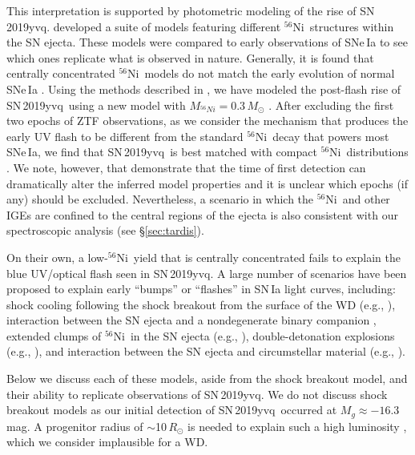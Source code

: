 \documentclass[twocolumn]{aastex63}
\newcommand{\radni}{$^{56}$Ni}
\newcommand{\sn}{SN\,2019yvq}
\begin{document}
This interpretation is supported by photometric modeling of the rise of \sn.
\citet{Magee20} developed a suite of models featuring different \radni\
structures within the SN ejecta. These models were compared to early
observations of SNe\,Ia to see which ones replicate what is observed in
nature. Generally, it is found that centrally concentrated \radni\ models do
not match the early evolution of normal SNe\,Ia \citep{Magee20}. Using the
methods described in \citet{Magee20}, we have modeled the post-flash rise of
\sn\ using a new model with $M_{^{56}Ni} = 0.3\,M_\odot$ \citep[the models
in][all have $M_{^{56}Ni} > 0.4\,M_\odot$ and are therefore more luminous than
\sn]{Magee20}. After excluding the first two epochs of ZTF observations, as we
consider the mechanism that produces the early UV flash to be different from
the standard \radni\ decay that powers most SNe\,Ia, we find that \sn\ is best
matched with compact \radni\ distributions \citep[following the convention
of][an \texttt{EXP\_Ni0.3\_KE1.40\_P21} model provides the best match to \sn,
see also Figure~\ref{fig:Ni_bullet}]{Magee20}. We note, however, that
\citet{Magee20} demonstrate that the time of first detection can dramatically
alter the inferred model properties and it is unclear which epochs (if any)
should be excluded. Nevertheless, a scenario in which the \radni\ and other
IGEs are confined to the central regions of the ejecta is also consistent with
our spectroscopic analysis (see \S\ref{sec:tardis}).

On their own, a low-\radni\ yield that is centrally concentrated fails to
explain the blue UV/optical flash seen in \sn. A large number of scenarios
have been proposed to explain early ``bumps'' or ``flashes'' in SN\,Ia light
curves, including: shock cooling following the shock breakout from the surface
of the WD (e.g., \citealt{Piro10,Rabinak11}), interaction between the SN
ejecta and a nondegenerate binary companion \citep{Kasen10a}, extended clumps
of \radni\ in the SN ejecta (e.g., \citealt{Dimitriadis19,Shappee19}),
double-detonation explosions (e.g., \citealt{Noebauer17,Polin19}), and
interaction between the SN ejecta and circumstellar material (e.g.,
\citealt{Dessart14,Piro16,Levanon17}).

Below we discuss each of these models, aside from the shock breakout
model, and their ability to replicate observations of \sn. We do not
discuss shock breakout models as our initial detection of \sn\ occurred at
$M_g \approx -16.3$\,mag. A progenitor radius of $\sim$10$\,R_\odot$ is needed
to explain such a high luminosity \citep{Piro10,Rabinak11}, which we consider
implausible for a WD.
\end{document}
